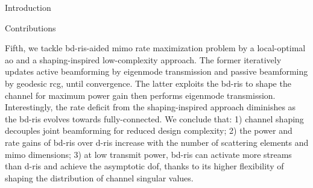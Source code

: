 \documentclass[journal]{IEEEtran}
\begin{document}
\begin{section}{Introduction}
\begin{subsection}{Contributions}



		Fifth, we tackle \gls{bd}-\gls{ris}-aided \gls{mimo} rate maximization problem by a local-optimal \gls{ao} and a shaping-inspired low-complexity approach.
		The former iteratively updates active beamforming by eigenmode transmission and passive beamforming by geodesic \gls{rcg}, until convergence.
		The latter exploits the \gls{bd}-\gls{ris} to shape the channel for maximum power gain then performs eigenmode transmission.
		Interestingly, the rate deficit from the shaping-inspired approach diminishes as the \gls{bd}-\gls{ris} evolves towards fully-connected.
		We conclude that: 1) channel shaping decouples joint beamforming for reduced design complexity; 2) the power and rate gains of \gls{bd}-\gls{ris} over \gls{d}-\gls{ris} increase with the number of scattering elements and \gls{mimo} dimensions; 3) at low transmit power, \gls{bd}-\gls{ris} can activate more streams than \gls{d}-\gls{ris} and achieve the asymptotic \gls{dof}, thanks to its higher flexibility of shaping the distribution of channel singular values.




\end{subsection}
\end{section}
\end{document}
